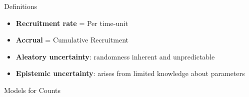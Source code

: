 \documentclass[english]{beamer}\usepackage[]{graphicx}\usepackage[]{xcolor}
\begin{document}
\begin{frame}{Definitions}

\begin{itemize}
\item \textbf{Recruitment rate} = Per time-unit \citep{piantadosi2024clinical}
\item \textbf{Accrual} = Cumulative Recruitment
\item \textbf{Aleatory uncertainty}: randomness inherent and unpredictable
\item \textbf{Epistemic uncertainty}: arises from limited knowledge about parameters



\end{itemize}


\end{frame}

\begin{frame}[shrink = 5]{Models for Counts}

\begin{table}[h!]
\centering
{}
\caption{Moments, aleatory and epistemic uncertainty in recruitment shown by different models for counts.}
\label{tab:count_modeling}
\end{table}

\begin{table}[h!]
\centering
{}
\caption{Moments, aleatory and epistemic uncertainty in accrual shown by different models for counts.}
\label{tab:count_modeling}
\end{table}

\end{frame}
\end{document}
